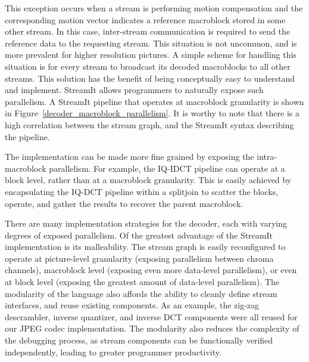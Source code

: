 \begin{figure*}[t]
\vspace{-12pt}
\caption{MPEG-2 decoder exploiting macroblock-level parallelism.}
\label{decoder_macroblock_parallelism}
\vspace{-6pt}
\end{figure*}

This exception occurs when a stream is performing motion compensation
and the corresponding motion vector indicates a reference macroblock
stored in some other stream. In this case, inter-stream communication
is required to send the reference data to the requesting stream. This
situation is not uncommon, and is more prevalent for higher resolution
pictures. A simple scheme for handling this situation is for every
stream to broadcast its decoded macroblocks to all other streams. This
solution has the benefit of being conceptually easy to understand and
implement. StreamIt allows programmers to naturally expose such
parallelism. A StreamIt pipeline that operates at macroblock
granularity is shown in Figure~\ref{decoder_macroblock_parallelism}. It is
worthy to note that there is a high correlation between the stream
graph, and the StreamIt syntax describing the pipeline.

The implementation can be made more fine grained by exposing the
intra-macroblock parallelism. For example, the IQ-IDCT pipeline can
operate at a block level, rather than at a macroblock
granularity. This is easily achieved by encapsulating the IQ-DCT pipeline
within a splitjoin to scatter the blocks, operate, and gather the
results to recover the parent macroblock.

There are many implementation strategies for the decoder, each with
varying degrees of exposed parallelism. Of the greatest advantage of
the StreamIt implementation is its malleability. The stream graph is
easily reconfigured to operate at picture-level granularity (exposing
parallelism between chroma channels), macroblock level (exposing even
more data-level parallelism), or even at block level (exposing the
greatest amount of data-level parallelism). The modularity of the
language also affords the ability to cleanly define stream interfaces,
and reuse existing components. As an example, the zig-zag descrambler,
inverse quantizer, and inverse DCT components were all reused for our
JPEG codec implementation. The modularity also reduces the complexity
of the debugging process, as stream components can be functionally
verified independently, leading to greater programmer productivity.



